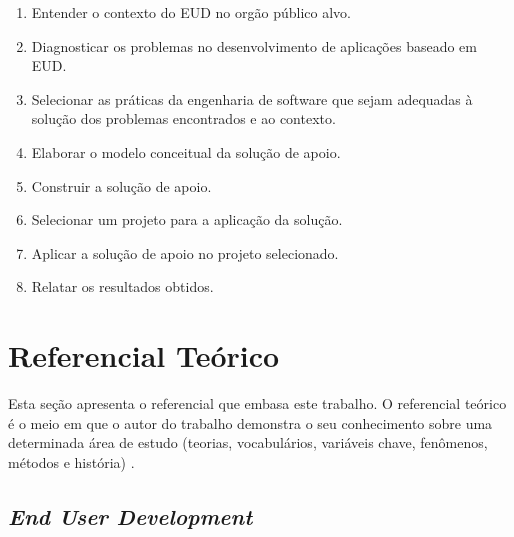 \begin{enumerate}
\item Entender o contexto do EUD no orgão público alvo.
\item Diagnosticar os problemas no desenvolvimento de aplicações baseado em EUD.
\item Selecionar as práticas da engenharia de software que sejam adequadas à solução dos problemas encontrados e ao contexto.
\item Elaborar o modelo conceitual da solução de apoio.
\item Construir a solução de apoio.
\item Selecionar um projeto para a aplicação da solução.
\item Aplicar a solução de apoio no projeto selecionado.
\item Relatar os resultados obtidos.
\end{enumerate}

\chapter[Referencial Teórico]{Referencial Teórico}

Esta seção apresenta o referencial que embasa este trabalho. O referencial teórico é o meio em que o autor do trabalho demonstra o seu conhecimento sobre uma determinada área de estudo (teorias, vocabulários, variáveis chave, fenômenos, métodos e história) \cite{randolph2009}.


\section{\textit{End User Development}}


